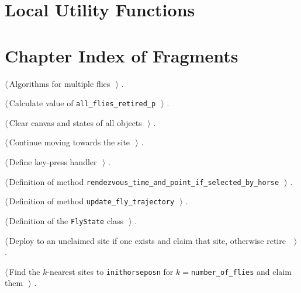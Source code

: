 \documentclass[11.5pt]{report}
\begin{document}
\section{Local Utility Functions}
\blindtext
\section{Chapter Index of Fragments}

{\small\begin{list}{}{\setlength{\itemsep}{-\parsep}\setlength{\itemindent}{-\leftmargin}}
\item $\langle\,$Algorithms for multiple flies\nobreak\ {\footnotesize {}}$\,\rangle$ {\footnotesize {\NWtxtRefIn} .}
\item $\langle\,$Calculate value of \verb|all_flies_retired_p|\nobreak\ {\footnotesize {}}$\,\rangle$ {\footnotesize {\NWtxtRefIn} .}
\item $\langle\,$Clear canvas and states of all objects\nobreak\ {\footnotesize {}}$\,\rangle$ {\footnotesize {\NWtxtRefIn} .}
\item $\langle\,$Continue moving towards the site\nobreak\ {\footnotesize {}}$\,\rangle$ {\footnotesize {\NWtxtRefIn} .}
\item $\langle\,$Define key-press handler\nobreak\ {\footnotesize {}}$\,\rangle$ {\footnotesize {\NWtxtRefIn} .}
\item $\langle\,$Definition of method \verb|rendezvous_time_and_point_if_selected_by_horse|\nobreak\ {\footnotesize {}}$\,\rangle$ {\footnotesize {\NWtxtRefIn} .}
\item $\langle\,$Definition of method \verb|update_fly_trajectory|\nobreak\ {\footnotesize {}}$\,\rangle$ {\footnotesize {\NWtxtRefIn} .}
\item $\langle\,$Definition of the \verb|FlyState| class\nobreak\ {\footnotesize {}}$\,\rangle$ {\footnotesize {\NWtxtRefIn} .}
\item $\langle\,$Deploy  to an unclaimed site if one exists and claim that site, otherwise retire \nobreak\ {\footnotesize {}}$\,\rangle$ {\footnotesize {\NWtxtRefIn} .}
\item $\langle\,$Find the $k$-nearest sites to \verb|inithorseposn| for $k=$\verb|number_of_flies| and claim them\nobreak\ {\footnotesize {}}$\,\rangle$ {\footnotesize {\NWtxtRefIn} .}

\end{list}}
\end{document}
